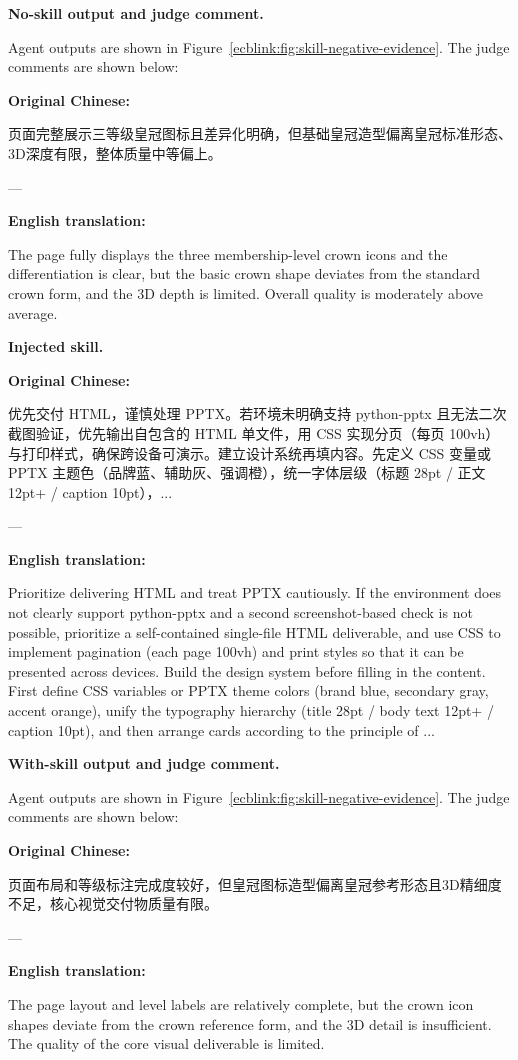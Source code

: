 \documentclass{llmxive}
\providecommand{\caseheader}[1]{\noindent\colorbox{fbcaseblue}{\parbox{0.96\linewidth}{\bfseries #1}}\vspace{0.5mm}\newline}
\begin{document}
\caseheader{No-skill output and judge comment.}
Agent outputs are shown in Figure~\ref{ecblink:fig:skill-negative-evidence}. The judge comments are shown below:

\begin{casebox}\scriptsize
\textbf{Original Chinese:}

页面完整展示三等级皇冠图标且差异化明确，但基础皇冠造型偏离皇冠标准形态、3D深度有限，整体质量中等偏上。

---

\textbf{English translation:}

The page fully displays the three membership-level crown icons and the differentiation is clear, but the basic crown shape deviates from the standard crown form, and the 3D depth is limited. Overall quality is moderately above average.
\end{casebox}

\caseheader{Injected skill.}
\begin{casebox}\scriptsize
\textbf{Original Chinese:}

优先交付 HTML，谨慎处理 PPTX。若环境未明确支持 python-pptx 且无法二次截图验证，优先输出自包含的 HTML 单文件，用 CSS 实现分页（每页 100vh）与打印样式，确保跨设备可演示。建立设计系统再填内容。先定义 CSS 变量或 PPTX 主题色（品牌蓝、辅助灰、强调橙），统一字体层级（标题 28pt / 正文 12pt+ / caption 10pt），...

---

\textbf{English translation:}

Prioritize delivering HTML and treat PPTX cautiously. If the environment does not clearly support python-pptx and a second screenshot-based check is not possible, prioritize a self-contained single-file HTML deliverable, and use CSS to implement pagination (each page 100vh) and print styles so that it can be presented across devices. Build the design system before filling in the content. First define CSS variables or PPTX theme colors (brand blue, secondary gray, accent orange), unify the typography hierarchy (title 28pt / body text 12pt+ / caption 10pt), and then arrange cards according to the principle of ...
\end{casebox}

\caseheader{With-skill output and judge comment.}
Agent outputs are shown in Figure~\ref{ecblink:fig:skill-negative-evidence}. The judge comments are shown below:
\begin{casebox}\scriptsize
\textbf{Original Chinese:}

页面布局和等级标注完成度较好，但皇冠图标造型偏离皇冠参考形态且3D精细度不足，核心视觉交付物质量有限。

---

\textbf{English translation:}

The page layout and level labels are relatively complete, but the crown icon shapes deviate from the crown reference form, and the 3D detail is insufficient. The quality of the core visual deliverable is limited.
\end{casebox}
\end{document}
